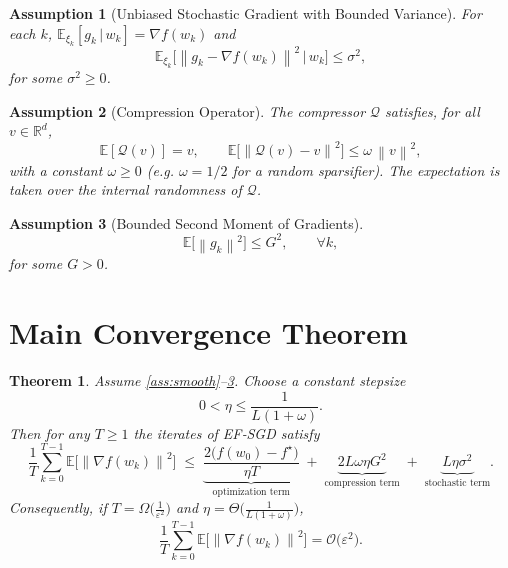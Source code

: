 \documentclass{article}
\newtheorem{theorem}{Theorem}
\newtheorem{assumption}{Assumption}
\newcommand{\E}{\mathbb{E}}
\newcommand{\R}{\mathbb{R}}
\newcommand{\norm}[1]{\left\|#1\right\|}
\newcommand{\Q}{\mathcal{Q}}
\begin{document}
\begin{assumption}[Unbiased Stochastic Gradient with Bounded Variance]\label{ass:sgd}
For each $k$, $\E_{\xi_k}[g_k\,|\,w_k]=\nabla f(w_k)$ and
\[
\E_{\xi_k}\!\big[\norm{g_k-\nabla f(w_k)}^{2}\,\big|\,w_k\big]\le\sigma^{2},
\]
for some $\sigma^{2}\ge0$.
\end{assumption}

\begin{assumption}[Compression Operator]\label{ass:compress}
The compressor $\Q$ satisfies, for all $v\in\R^{d}$,
\[
\E[\Q(v)]=v,\qquad
\E\!\big[\norm{\Q(v)-v}^{2}\big]\le \omega\,\norm{v}^{2},
\]
with a constant $\omega\ge0$ (e.g. $\omega=1/2$ for a random sparsifier). The expectation is taken over the internal randomness of $\Q$.
\end{assumption}

\begin{assumption}[Bounded Second Moment of Gradients]\label{ass:bounded}
\[
\E\!\big[\norm{g_k}^{2}\big]\le G^{2},\qquad\forall k,
\]
for some $G>0$.
\end{assumption}

\section*{Main Convergence Theorem}
\begin{theorem}\label{thm:main}
Assume \ref{ass:smooth}–\ref{ass:bounded}. Choose a constant stepsize
\[
0<\eta\le\frac{1}{L(1+\omega)}.
\]
Then for any $T\ge1$ the iterates of EF‑SGD satisfy
\[
\frac{1}{T}\sum_{k=0}^{T-1}\E\!\big[\norm{\nabla f(w_k)}^{2}\big]
\;\le\;
\underbrace{\frac{2\big(f(w_0)-f^\star\big)}{\eta T}}_{\text{optimization term}}
\;+\;
\underbrace{2L\omega\eta G^{2}}_{\text{compression term}}
\;+\;
\underbrace{L\eta\sigma^{2}}_{\text{stochastic term}} .
\]
Consequently, if $T=\Omega\!\big(\tfrac{1}{\varepsilon^{2}}\big)$ and $\eta= \Theta\!\big(\tfrac{1}{L(1+\omega)}\big)$,
\[
\frac{1}{T}\sum_{k=0}^{T-1}\E\!\big[\norm{\nabla f(w_k)}^{2}\big]=\mathcal{O}\!\big(\varepsilon^{2}\big).
\]
\end{theorem}
\end{document}
